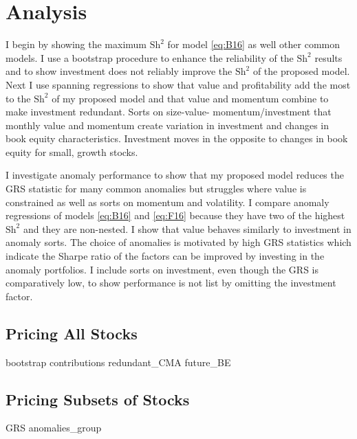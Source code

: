 
\section*{Analysis}

I begin by showing the maximum $\text{Sh}^2$ for model \ref{eq:B16} as well
other common models. I use a bootstrap procedure to enhance the reliability of
the $\text{Sh}^2$ results and to show investment does not reliably improve the
$\text{Sh}^2$ of the proposed model. Next I use spanning regressions to show
that value and profitability add the most to the $\text{Sh}^2$ of my proposed
model and that value and momentum combine to make investment redundant. Sorts
on size-value- momentum/investment that monthly value and momentum create
variation in investment and changes in book equity characteristics. Investment
moves in the opposite to changes in book equity for small, growth stocks.

I investigate anomaly performance to show that my proposed model reduces the
GRS statistic for many common anomalies but struggles where value is
constrained as well as sorts on momentum and volatility. I compare anomaly
regressions of models \ref{eq:B16} and \ref{eq:F16} because they have two of
the highest $\text{Sh}^2$ and they are non-nested. I show that value behaves
similarly to investment in anomaly sorts. The choice of anomalies is motivated
by high GRS statistics which indicate the Sharpe ratio of the factors can be
improved by investing in the anomaly portfolios. I include sorts on investment,
even though the GRS is comparatively low, to show performance is not list by
omitting the investment factor.


\subsection*{Pricing All Stocks}

{bootstrap}
{contributions}
{redundant_CMA}
{future_BE}

\subsection*{Pricing Subsets of Stocks}

{GRS}
{anomalies_group}
